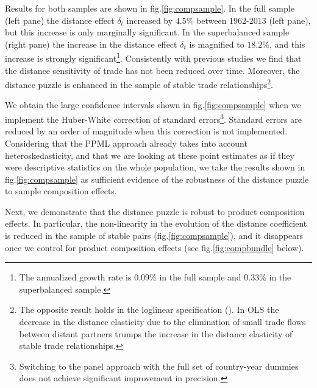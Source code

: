 \documentclass[12pt,twoside,a4paper,notitlepage]{article}
\begin{document}
Results for both samples are shown in fig.\ref{fig:compsample}. In the full sample (left pane) the distance effect $\delta_t$ increased by $4.5$\% between 1962-2013 (left pane), but this increase is only marginally significant. In the superbalanced sample (right pane) the increase in the distance effect $\delta_t$ is magnified to $18.2$\%, and this increase is strongly significant\footnote{The annualized growth rate is 0.09\% in the full sample and 0.33\% in the superbalanced sample.}. 
Consistently with previous studies we find that the distance sensitivity of trade has not been reduced over time. Moreover, the distance puzzle is enhanced in the sample of stable trade relationships\footnote{The opposite result holds in the loglinear specification (\cite{Head2013}). In OLS the decrease in the distance elasticity due to the elimination of small trade flows between distant partners trumps the increase in the distance elasticity of stable trade relationships.}. 

We obtain the large confidence intervals shown in fig.\ref{fig:compsample} when we implement the Huber-White correction of standard errors\footnote{Switching to the panel approach with the full set of country-year dummies does not achieve significant improvement in precision.}.  Standard errors are reduced by an order of magnitude when this correction is not implemented.  
Considering that the PPML approach already takes into account heteroskedasticity, and that we are looking at these point estimates as if they were descriptive statistics on the whole population, we take the results shown in fig.\ref{fig:compsample} as sufficient evidence of the robustness of the distance puzzle to sample composition effects. 

Next, we demonstrate that the distance puzzle is robust to product composition effects. In particular, the non-linearity in the evolution of the distance coefficient  is reduced in the sample of stable pairs (fig.\ref{fig:compsample}), and it \fi disappears once we control for product composition effects (see fig.\ref{fig:compbundle} below).
\end{document}
